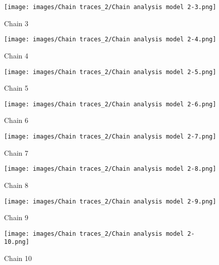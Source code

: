 \documentclass[12pt]{article}
\begin{document}
\begin{figure}[!htb]
   \begin{minipage}{0.48\textwidth}
     \centering
     \texttt{[image: images/Chain traces\_2/Chain analysis model 2-3.png]}
     \caption{Chain 3}\label{Fig:Chain 3}
   \end{minipage}\hfill
   \begin{minipage}{0.48\textwidth}
     \centering
     \texttt{[image: images/Chain traces\_2/Chain analysis model 2-4.png]}
     \caption{Chain 4}\label{Fig: Chain 4}
   \end{minipage}
\end{figure}

\begin{figure}[!htb]
   \begin{minipage}{0.48\textwidth}
     \centering
     \texttt{[image: images/Chain traces\_2/Chain analysis model 2-5.png]}
     \caption{Chain 5}\label{Fig:Chain 5}
   \end{minipage}\hfill
   \begin{minipage}{0.48\textwidth}
     \centering
     \texttt{[image: images/Chain traces\_2/Chain analysis model 2-6.png]}
     \caption{Chain 6}\label{Fig: Chain 6}
   \end{minipage}
\end{figure}

\begin{figure}[!htb]
   \begin{minipage}{0.48\textwidth}
     \centering
     \texttt{[image: images/Chain traces\_2/Chain analysis model 2-7.png]}
     \caption{Chain 7}\label{Fig:Chain 7}
   \end{minipage}\hfill
   \begin{minipage}{0.48\textwidth}
     \centering
     \texttt{[image: images/Chain traces\_2/Chain analysis model 2-8.png]}
     \caption{Chain 8}\label{Fig: Chain 8}
   \end{minipage}
\end{figure}

\begin{figure}[!htb]
   \begin{minipage}{0.48\textwidth}
     \centering
     \texttt{[image: images/Chain traces\_2/Chain analysis model 2-9.png]}
     \caption{Chain 9}\label{Fig:Chain 9}
   \end{minipage}\hfill
   \begin{minipage}{0.48\textwidth}
     \centering
     \texttt{[image: images/Chain traces\_2/Chain analysis model 2-10.png]}
     \caption{Chain 10}\label{Fig: Chain 10}
   \end{minipage}
\end{figure}
\end{document}
